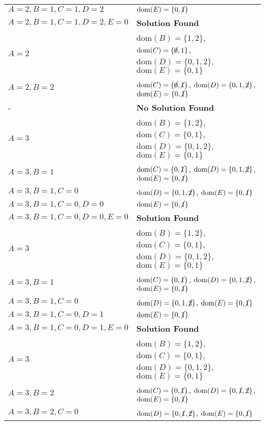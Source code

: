 \begin{example}
\begin{center}
\begin{tabular}{ll}
            $A=2,B=1,C=1,D=2$ & $\text{dom}(E) = \{0,\cancel{1}\}$ \\
            $A=2,B=1,C=1,D=2,E=0$ & \textbf{Solution Found} \\
            \midrule 
            $A=2$ & $\text{dom}(B) = \{1,2\}$, $\text{dom}(C) = \{\cancel{0},1\}$, $\text{dom}(D) = \{0,1,2\}$, $\text{dom}(E) = \{0,1\}$ \\ 
            $A=2,B=2$ & $\text{dom}(C) = \{\cancel{0},\cancel{1}\}$, $\text{dom}(D) = \{0,1,\cancel{2}\}$, $\text{dom}(E) = \{0,\cancel{1}\}$ \\           
            - & \textbf{No Solution Found} \\
            \midrule 
            $A=3$ & $\text{dom}(B) = \{1,2\}$, $\text{dom}(C) = \{0,1\}$, $\text{dom}(D) = \{0,1,2\}$, $\text{dom}(E) = \{0,1\}$ \\
            $A=3,B=1$ & $\text{dom}(C) = \{0,\cancel{1}\}$, $\text{dom}(D) = \{0,1,\cancel{2}\}$, $\text{dom}(E) = \{0,\cancel{1}\}$ \\
            $A=3,B=1,C=0$ & $\text{dom}(D) = \{0,1,\cancel{2}\}$, $\text{dom}(E) = \{0,\cancel{1}\}$ \\
            $A=3,B=1,C=0,D=0$ & $\text{dom}(E) = \{0,\cancel{1}\}$ \\
            $A=3,B=1,C=0,D=0,E=0$ & \textbf{Solution Found} \\
            \midrule 
            $A=3$ & $\text{dom}(B) = \{1,2\}$, $\text{dom}(C) = \{0,1\}$, $\text{dom}(D) = \{0,1,2\}$, $\text{dom}(E) = \{0,1\}$ \\
            $A=3,B=1$ & $\text{dom}(C) = \{0,\cancel{1}\}$, $\text{dom}(D) = \{0,1,\cancel{2}\}$, $\text{dom}(E) = \{0,\cancel{1}\}$ \\
            $A=3,B=1,C=0$ & $\text{dom}(D) = \{0,1,\cancel{2}\}$, $\text{dom}(E) = \{0,\cancel{1}\}$ \\
            $A=3,B=1,C=0,D=1$ & $\text{dom}(E) = \{0,\cancel{1}\}$ \\
            $A=3,B=1,C=0,D=1,E=0$ & \textbf{Solution Found} \\
            \midrule 
            $A=3$ & $\text{dom}(B) = \{1,2\}$, $\text{dom}(C) = \{0,1\}$, $\text{dom}(D) = \{0,1,2\}$, $\text{dom}(E) = \{0,1\}$ \\
            $A=3,B=2$ & $\text{dom}(C) = \{0,\cancel{1}\}$, $\text{dom}(D) = \{0,\cancel{1},\cancel{2}\}$, $\text{dom}(E) = \{0,\cancel{1}\}$ \\
            $A=3,B=2,C=0$ & $\text{dom}(D) = \{0,\cancel{1},\cancel{2}\}$, $\text{dom}(E) = \{0,\cancel{1}\}$ \\

\end{tabular}
\end{center}
\end{example}
